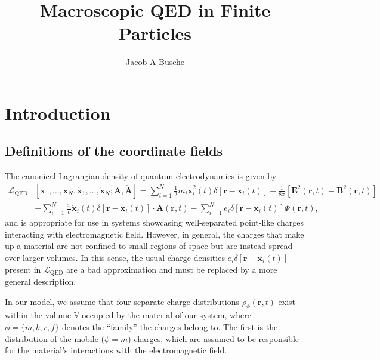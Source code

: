 \documentclass{article}
\begin{document}
\title{Macroscopic QED in Finite Particles}
\author{Jacob A Busche}
\maketitle











\section{Introduction}

\subsection{Definitions of the coordinate fields}\label{sec:coordinateFields}

The canonical Lagrangian density of quantum electrodynamics is given by\cite{cohen-tannoudji2004photons}
\begin{equation}\label{eq:lagrangianDensityQED}
\begin{split}
\mathcal{L}_\mathrm{QED}&\left[\mathbf{x}_1,\ldots,\mathbf{x}_N,\dot{\mathbf{x}}_1,\ldots,\dot{\mathbf{x}}_N;\mathbf{A},\dot{\mathbf{A}}\right] = \sum_{i = 1}^N\frac{1}{2}m_i\dot{\mathbf{x}}_i^2(t)\delta[\mathbf{r} - \mathbf{x}_i(t)] + \frac{1}{8\pi}\left[\mathbf{E}^2(\mathbf{r},t) - \mathbf{B}^2(\mathbf{r},t)\right]\\
&+ \sum_{i = 1}^N\frac{e_i}{c}\dot{\mathbf{x}}_i(t)\delta[\mathbf{r} - \mathbf{x}_i(t)]\cdot\mathbf{A}(\mathbf{r},t) - \sum_{i = 1}^Ne_i\delta[\mathbf{r} - \mathbf{x}_i(t)]\Phi(\mathbf{r},t),
\end{split}
\end{equation}
and is appropriate for use in systems showcasing well-separated point-like charges interacting with electromagnetic field. However, in general, the charges that make up a material are not confined to small regions of space but are instead spread over larger volumes. In this sense, the usual charge densities $e_i\delta[\mathbf{r} - \mathbf{x}_i(t)]$ present in $\mathcal{L}_\mathrm{QED}$ are a bad approximation and must be replaced by a more general description. 

In our model, we assume that four separate charge distributions $\rho_\phi(\mathbf{r},t)$ exist within the volume $\mathbb{V}$ occupied by the material of our system, where $\phi = \{m,b,r,f\}$ denotes the ``family'' the charges belong to. The first is the distribution of the mobile ($\phi = m$) charges, which are assumed to be responsible for the material's interactions with the electromagnetic field. 
\end{document}
